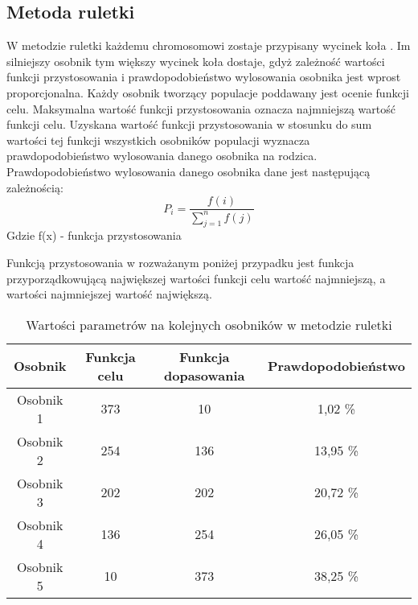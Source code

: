 
\subsection{Metoda ruletki}\label{sec:narzedzia}


W metodzie ruletki każdemu chromosomowi zostaje przypisany wycinek koła \cite{selekcje}. Im silniejszy osobnik tym większy wycinek koła dostaje, gdyż zależność wartości funkcji przystosowania i prawdopodobieństwo wylosowania osobnika jest wprost proporcjonalna. Każdy osobnik tworzący populacje poddawany jest ocenie funkcji celu. Maksymalna wartość funkcji przystosowania oznacza najmniejszą wartość funkcji celu. Uzyskana wartość funkcji przystosowania w stosunku do sum wartości tej funkcji wszystkich osobników populacji wyznacza prawdopodobieństwo wylosowania danego osobnika na rodzica. Prawdopodobieństwo wylosowania danego osobnika dane jest następującą zależnością:
$$
P_i = \frac{f(i)}{\sum_{j=1}^{n}f(j)}
$$
Gdzie f(x) - funkcja przystosowania\\
\par
Funkcją przystosowania w rozważanym poniżej przypadku jest funkcja przyporządkowującą największej wartości funkcji celu wartość najmniejszą, a wartości najmniejszej wartość największą.

\begin{table}[h!]
\begin{center}
\begin{tabular}{|c|c|c|c|}
\hline
\textbf{Osobnik}  & \textbf{Funkcja celu} & \textbf{Funkcja dopasowania} & \textbf{Prawdopodobieństwo}\\
\hline
Osobnik 1 & 373 & 10 & 1,02  \% \\
\hline
Osobnik 2 &254 & 136  & 13,95  \% \\
\hline
Osobnik 3 & 202 & 202 & 20,72  \% \\
\hline
Osobnik 4 & 136 & 254 & 26,05  \% \\
\hline
Osobnik 5 & 10 & 373 & 38,25  \% \\
\hline
\end{tabular}
\caption{Wartości parametrów na kolejnych osobników w metodzie ruletki}
\end{center}
\end{table}

\vspace{0,4cm}

